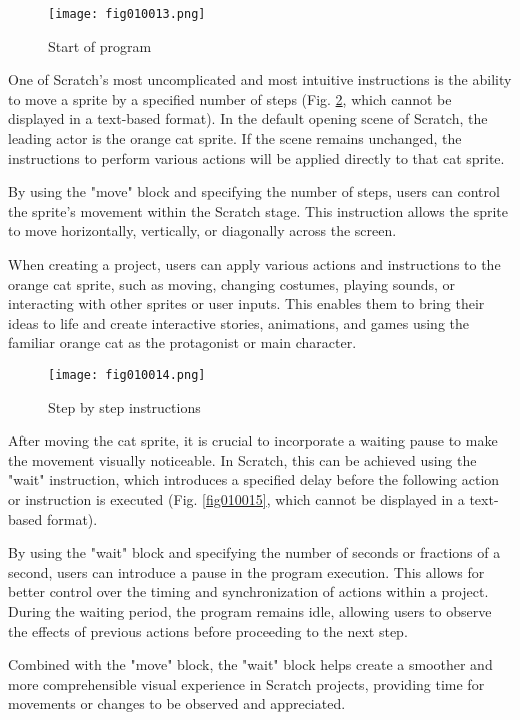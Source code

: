 \begin{figure}[H]
   \centering
   \texttt{[image: fig010013.png]}
   \caption{Start of program}
\label{fig010013}
\end{figure}

One of Scratch's most uncomplicated and most intuitive instructions is the ability to move a sprite by a specified number of steps (Fig. \ref{fig010014}, which cannot be displayed in a text-based format). In the default opening scene of Scratch, the leading actor is the orange cat sprite. If the scene remains unchanged, the instructions to perform various actions will be applied directly to that cat sprite.

By using the "move" block and specifying the number of steps, users can control the sprite's movement within the Scratch stage. This instruction allows the sprite to move horizontally, vertically, or diagonally across the screen.

When creating a project, users can apply various actions and instructions to the orange cat sprite, such as moving, changing costumes, playing sounds, or interacting with other sprites or user inputs. This enables them to bring their ideas to life and create interactive stories, animations, and games using the familiar orange cat as the protagonist or main character.

\begin{figure}[H]
   \centering
   \texttt{[image: fig010014.png]}
   \caption{Step by step instructions}
\label{fig010014}
\end{figure}

After moving the cat sprite, it is crucial to incorporate a waiting pause to make the movement visually noticeable. In Scratch, this can be achieved using the "wait" instruction, which introduces a specified delay before the following action or instruction is executed (Fig. \ref{fig010015}, which cannot be displayed in a text-based format).

By using the "wait" block and specifying the number of seconds or fractions of a second, users can introduce a pause in the program execution. This allows for better control over the timing and synchronization of actions within a project. During the waiting period, the program remains idle, allowing users to observe the effects of previous actions before proceeding to the next step.

Combined with the "move" block, the "wait" block helps create a smoother and more comprehensible visual experience in Scratch projects, providing time for movements or changes to be observed and appreciated.

